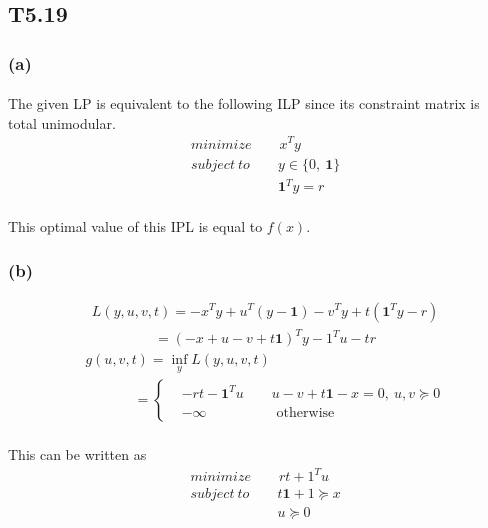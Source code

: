 \subsection*{T5.19}
\subsubsection*{(a)}
\paragraph{}
The given LP is equivalent to the following ILP since its constraint matrix is total unimodular.
\begin{align*}
&minimize \qquad x^Ty\\
&subject\ to \qquad y \in \{0,\ \textbf{1}\}\\
&\qquad \qquad \qquad \ \textbf{1}^Ty =r
\end{align*}
\paragraph{}
This optimal value of this IPL is equal to $f(x)$.
\subsubsection*{(b)}
\begin{align*}
&L(y, u, v, t) = -x^Ty + u^T(y-\textbf{1}) -v^Ty + t(\textbf{1}^Ty -r)  \\
&\qquad \qquad\ \  =(-x+u-v+t\textbf{1})^Ty -1^Tu-tr
\end{align*}
\begin{align*}
&g(u,v,t) = \inf_y L(y,u,v,t)\\
& \qquad  \quad \ \ =\begin{cases}
& -rt -\textbf{1}^Tu \qquad   u-v+t\textbf{1}-x =0, \ u,v \succeq 0\\
& -\infty \qquad \qquad \quad \text{otherwise}
\end{cases}
\end{align*}
\paragraph{}
This can be written as 
\begin{align*}
&minimize \qquad rt+1^Tu\\
&subject\ to \qquad t\textbf{1} +1 \succeq x\\
&\qquad \qquad \qquad \ u \succeq 0
\end{align*}
